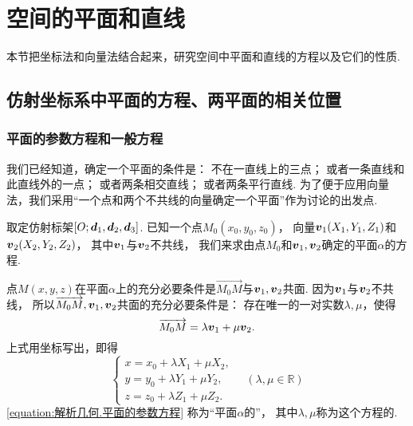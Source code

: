 \section{空间的平面和直线}
本节把坐标法和向量法结合起来，研究空间中平面和直线的方程以及它们的性质.

\subsection{仿射坐标系中平面的方程、两平面的相关位置}
\subsubsection{平面的参数方程和一般方程}
我们已经知道，确定一个平面的条件是：
不在一直线上的三点；
或者一条直线和此直线外的一点；
或者两条相交直线；
或者两条平行直线.
为了便于应用向量法，我们采用“一个点和两个不共线的向量确定一个平面”作为讨论的出发点.

取定仿射标架\([O;\boldsymbol{d}_1,\boldsymbol{d}_2,\boldsymbol{d}_3]\).
已知一个点\(M_0(x_0,y_0,z_0)\)，
向量\(\boldsymbol{v}_1(X_1,Y_1,Z_1)\)和\(\boldsymbol{v}_2(X_2,Y_2,Z_2)\)，
其中\(\boldsymbol{v}_1\)与\(\boldsymbol{v}_2\)不共线，
我们来求由点\(M_0\)和\(\boldsymbol{v}_1,\boldsymbol{v}_2\)确定的平面\(\alpha\)的方程.

点\(M(x,y,z)\)在平面\(\alpha\)上的充分必要条件是\(\vec{M_0 M}\)与\(\boldsymbol{v}_1,\boldsymbol{v}_2\)共面.
因为\(\boldsymbol{v}_1\)与\(\boldsymbol{v}_2\)不共线，
所以\(\overrightarrow{M_0 M},\boldsymbol{v}_1,\boldsymbol{v}_2\)共面的充分必要条件是：
存在唯一的一对实数\(\lambda,\mu\)，使得\[
	\overrightarrow{M_0 M} = \lambda \boldsymbol{v}_1 + \mu \boldsymbol{v}_2.
\]
上式用坐标写出，即得
\begin{equation}\label{equation:解析几何.平面的参数方程}
	\left\{ \begin{array}{l}
		x = x_0 + \lambda X_1 + \mu X_2, \\
		y = y_0 + \lambda Y_1 + \mu Y_2, \\
		z = z_0 + \lambda Z_1 + \mu Z_2.
	\end{array} \right.
	\quad(\lambda,\mu\in\mathbb{R})
\end{equation}
\cref{equation:解析几何.平面的参数方程}
称为“平面\(\alpha\)的”，
其中\(\lambda,\mu\)称为这个方程的.


